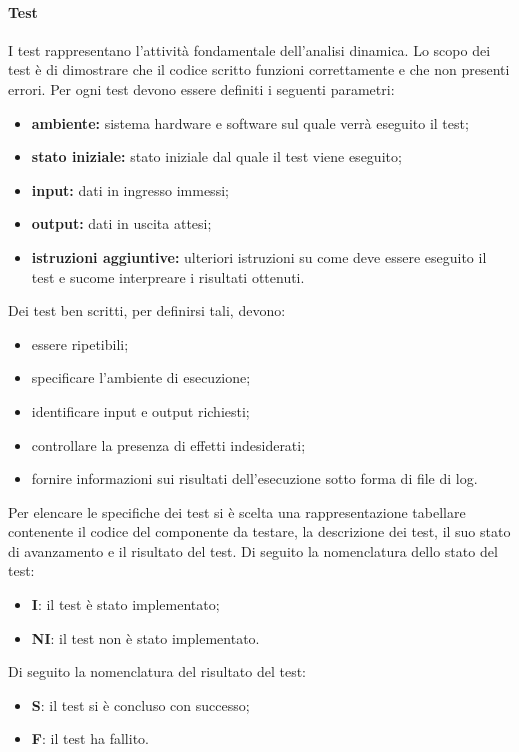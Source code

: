 			\paragraph{Test}
			I test rappresentano l'attività fondamentale dell'analisi dinamica. Lo scopo dei test è di dimostrare che il codice scritto funzioni correttamente e che non presenti errori. 
			Per ogni test devono essere definiti i seguenti parametri: 
			\begin{itemize}
			\item \textbf{ambiente:} sistema hardware e software sul quale verrà eseguito il test;
			\item \textbf{stato iniziale:} stato iniziale dal quale il test viene eseguito;
			\item \textbf{input:} dati in ingresso immessi;
			\item \textbf{output:} dati in uscita attesi;
			\item \textbf{istruzioni aggiuntive:} ulteriori istruzioni su come deve essere eseguito il test e sucome interpreare i risultati ottenuti.
			\end{itemize}
			Dei test ben scritti, per definirsi tali, devono:
			\begin{itemize}
			\item essere ripetibili;
			\item specificare l'ambiente di esecuzione;
			\item identificare input e output richiesti;
			\item controllare la presenza di effetti indesiderati;
			\item fornire informazioni sui risultati dell’esecuzione sotto forma di file di log.
			\end{itemize}
			Per elencare le specifiche dei test si è scelta una rappresentazione tabellare contenente il codice del componente da testare, la descrizione dei test, il suo stato di avanzamento e il risultato del test.
			Di seguito la nomenclatura dello stato del test:
			\begin{itemize}
				\item \textbf{I}: il test è stato implementato;
				\item \textbf{NI}: il test non è stato implementato.
			\end{itemize}			
			Di seguito la nomenclatura del risultato del test:
			\begin{itemize}
				\item \textbf{S}: il test si è concluso con successo;
				\item \textbf{F}: il test ha fallito.
			\end{itemize}		
